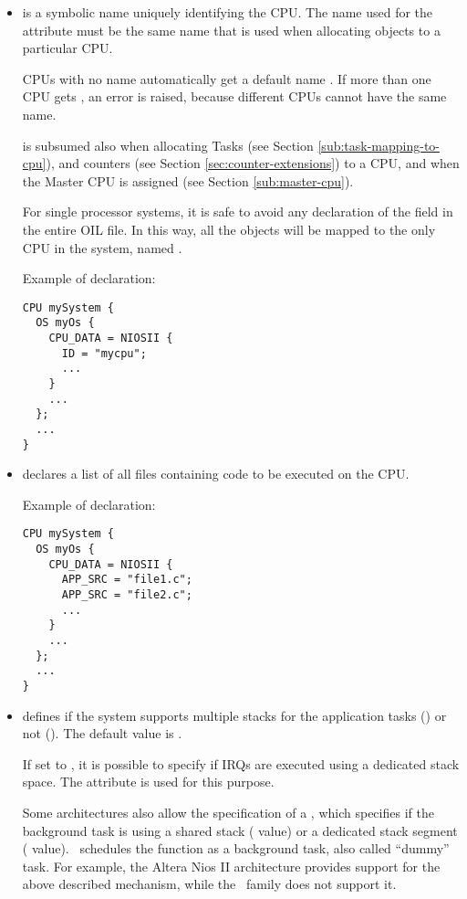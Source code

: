 \begin{itemize}
\item {} is a symbolic name uniquely identifying the
  CPU. The name used for the  attribute must be the same
  name that is used when allocating objects to a particular CPU.

  CPUs with no name automatically get a default name
  . If more than one CPU gets
  , an error is raised, because different CPUs
  cannot have the same name.

   is subsumed also when allocating Tasks (see
  Section \ref{sub:task-mapping-to-cpu}), and counters (see Section
  \ref{sec:counter-extensions}) to a CPU, and when the Master CPU is
  assigned (see Section \ref{sub:master-cpu}).

  For single processor systems, it is safe to avoid any declaration of
  the  field in the entire OIL file. In this way, all
  the objects will be mapped to the only CPU in the system, named
  .

  Example of declaration:

\begin{lstlisting}
CPU mySystem {
  OS myOs {
    CPU_DATA = NIOSII {
      ID = "mycpu";
      ...
    }
    ...
  };
  ...
}
\end{lstlisting}

\item {} declares a list of all files containing code to
  be executed on the CPU.

  Example of declaration:

\begin{lstlisting}
CPU mySystem {
  OS myOs {
    CPU_DATA = NIOSII {
      APP_SRC = "file1.c";
      APP_SRC = "file2.c";
      ...
    }
    ...
  };
  ...
}
\end{lstlisting}


\item {} defines if the system supports multiple
  stacks for the application tasks () or not
  (). The default value is .

  If set to , it is possible to specify if IRQs are
  executed using a dedicated stack space. The attribute
   is used for this purpose.

  Some architectures also allow the specification of a
  , which specifies if the background task is using
  a shared stack ( value) or a dedicated stack segment
  ( value). \ee\ schedules the 
  function as a background task, also called ``dummy'' task. For
  example, the Altera Nios II architecture provides support for the
  above described mechanism, while the \dspic\ family does not support
  it.


\end{itemize}
